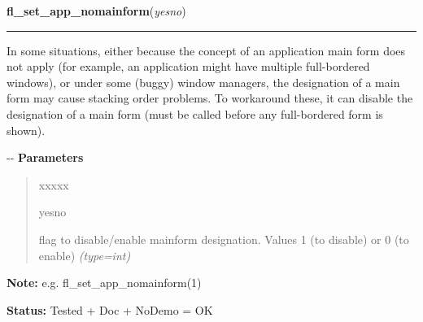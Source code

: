     \label{xformslib:flbasic:fl_set_app_nomainform}

    \vspace{0.5ex}

\hspace{.8\funcindent}\begin{boxedminipage}{\funcwidth}

    \raggedright \textbf{fl\_set\_app\_nomainform}(\textit{yesno})

    \vspace{-1.5ex}

    \rule{\textwidth}{0.5\fboxrule}
\setlength{\parskip}{2ex}

In some situations, either because the concept of an application
main form does not apply (for example, an application might have
multiple full-bordered windows), or under some (buggy) window managers,
the designation of a main form may cause stacking order problems. To
workaround these, it can disable the designation of a main form (must
be called before any full-bordered form is shown).

-{}-
\setlength{\parskip}{1ex}
      \textbf{Parameters}
      \vspace{-1ex}

      \begin{quote}
        \begin{Ventry}{xxxxx}

          \item[yesno]


flag to disable/enable mainform designation. Values 1 (to disable) or
0 (to enable)
            {\it (type=int)}

        \end{Ventry}

      \end{quote}

\textbf{Note:} 
e.g. fl\_set\_app\_nomainform(1)


\textbf{Status:} 
Tested + Doc + NoDemo = OK


    \end{boxedminipage}

    \label{xformslib:flbasic:fl_set_form_callback}

    \vspace{0.5ex}

